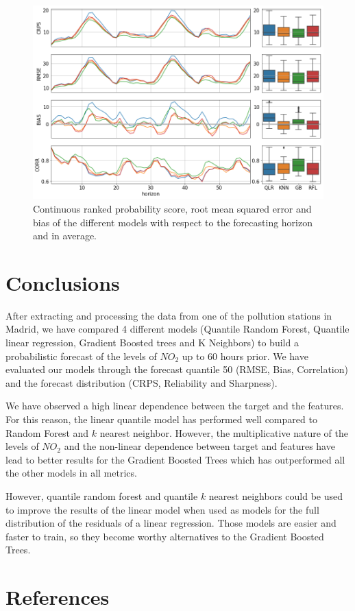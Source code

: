 \documentclass[a4paper,twocolumn,5p]{elsarticle}
\begin{document}
\begin{figure}
  \centering
  \includegraphics[width=\textwidth]{results/errorGraph_rfl_knnl}
  \caption{Continuous ranked probability score, root mean squared
    error and bias of the different models with respect to the
    forecasting horizon and in average.}
  \label{figure:errorGraph_rfl}
\end{figure}

\section{Conclusions}
\label{sec:concl}

After extracting and processing the data from 
one of the pollution stations in Madrid,
we have compared 4 different models 
(Quantile Random Forest, 
Quantile linear regression, 
Gradient Boosted trees 
and K Neighbors)
to 
build a probabilistic forecast of the levels 
of $NO_2$ up to 60 hours prior. We have evaluated 
our models through the forecast 
quantile 50 (RMSE, Bias, Correlation) 
and the forecast distribution (CRPS, 
Reliability and Sharpness).

We have observed a high linear dependence 
between the target and the features. For this 
reason, the linear quantile model has performed 
well compared to Random Forest and $k$ nearest 
neighbor. However, the 
multiplicative nature of the levels of $NO_2$
and the non-linear dependence between target and 
features have lead to better results 
for the Gradient Boosted Trees 
which has outperformed all the other models in all 
metrics. 

However, quantile random forest and quantile $k$ nearest neighbors 
could be used to improve the results of the linear model when 
used as models for the full distribution of the residuals 
of a linear regression. Those models are easier and faster to 
train, so they become worthy alternatives to the Gradient Boosted Trees.


\section{References}


\end{document}
